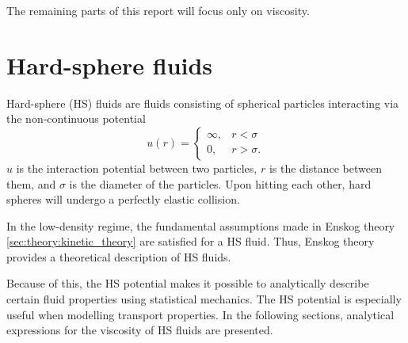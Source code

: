The remaining parts of this report will focus only on viscosity.


\section{Hard-sphere fluids}
Hard-sphere (HS) fluids are fluids consisting of spherical particles 
interacting via the non-continuous potential 
\[
    \label{eq:hard_sphere_potential}
    u(r) = 
    \begin{cases}
        \infty, & r < \sigma \\
        0, & r > \sigma.
    \end{cases}
\]
$u$ is the interaction potential between two 
particles, $r$ is the distance between them, 
and $\sigma$ is the diameter of the particles. 
Upon hitting each other, hard spheres will 
undergo a perfectly elastic collision.

In the low-density regime, the fundamental 
assumptions made in Enskog theory 
\ref{sec:theory:kinetic_theory} are satisfied
for a HS fluid. Thus, Enskog theory provides a 
theoretical description of HS fluids. 

Because of this, the HS potential makes it 
possible to analytically describe certain fluid 
properties using statistical mechanics. The HS 
potential is especially useful when modelling 
transport properties. In the following sections, 
analytical expressions for the viscosity of HS 
fluids are presented.


